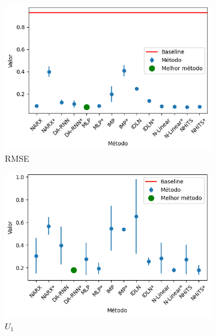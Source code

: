 \begin{figure}[htbp]
	\begin{subfigure}[b]{0.3\textwidth}
		\centering
		\includegraphics[width=\textwidth]{figuras/rmse_takens_brasil_oil_results.png}
		\caption{\ac{RMSE}}
		\label{fig:rmse_takens_brasil_oil_results}
	\end{subfigure}
	\hfill
	\begin{subfigure}[b]{0.3\textwidth}
		\centering
		\includegraphics[width=\textwidth]{figuras/u1_takens_brasil_oil_results.png}
		\caption{\(U_1\)}
		\label{fig:u1_takens_brasil_oil_results}
	\end{subfigure}
	\hfill
	\begin{subfigure}[b]{0.3\textwidth}
		\centering

\end{subfigure}
\end{figure}

